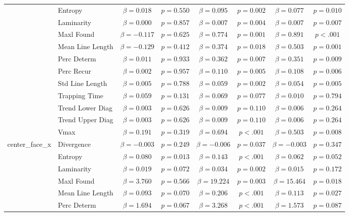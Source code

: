 \begin{tabular}{llcc|cc|cc}
 & Entropy & $\beta = 0.018$ & $p = 0.550$ & $\beta = 0.095$ & $p = 0.002$ & $\beta = 0.077$ & $p = 0.010$ \\
 & Laminarity & $\beta = 0.000$ & $p = 0.857$ & $\beta = 0.007$ & $p = 0.004$ & $\beta = 0.007$ & $p = 0.007$ \\
 & Maxl Found & $\beta = -0.117$ & $p = 0.625$ & $\beta = 0.774$ & $p = 0.001$ & $\beta = 0.891$ & $p < .001$ \\
 & Mean Line Length & $\beta = -0.129$ & $p = 0.412$ & $\beta = 0.374$ & $p = 0.018$ & $\beta = 0.503$ & $p = 0.001$ \\
 & Perc Determ & $\beta = 0.011$ & $p = 0.933$ & $\beta = 0.362$ & $p = 0.007$ & $\beta = 0.351$ & $p = 0.009$ \\
 & Perc Recur & $\beta = 0.002$ & $p = 0.957$ & $\beta = 0.110$ & $p = 0.005$ & $\beta = 0.108$ & $p = 0.006$ \\
 & Std Line Length & $\beta = 0.005$ & $p = 0.788$ & $\beta = 0.059$ & $p = 0.002$ & $\beta = 0.054$ & $p = 0.005$ \\
 & Trapping Time & $\beta = 0.059$ & $p = 0.131$ & $\beta = 0.069$ & $p = 0.077$ & $\beta = 0.010$ & $p = 0.794$ \\
 & Trend Lower Diag & $\beta = 0.003$ & $p = 0.626$ & $\beta = 0.009$ & $p = 0.110$ & $\beta = 0.006$ & $p = 0.264$ \\
 & Trend Upper Diag & $\beta = 0.003$ & $p = 0.626$ & $\beta = 0.009$ & $p = 0.110$ & $\beta = 0.006$ & $p = 0.264$ \\
 & Vmax & $\beta = 0.191$ & $p = 0.319$ & $\beta = 0.694$ & $p < .001$ & $\beta = 0.503$ & $p = 0.008$ \\
\midrule
\multirow{12}{*}{center_face_x} & Divergence & $\beta = -0.003$ & $p = 0.249$ & $\beta = -0.006$ & $p = 0.037$ & $\beta = -0.003$ & $p = 0.347$ \\
 & Entropy & $\beta = 0.080$ & $p = 0.013$ & $\beta = 0.143$ & $p < .001$ & $\beta = 0.062$ & $p = 0.052$ \\
 & Laminarity & $\beta = 0.019$ & $p = 0.072$ & $\beta = 0.034$ & $p = 0.002$ & $\beta = 0.015$ & $p = 0.172$ \\
 & Maxl Found & $\beta = 3.760$ & $p = 0.566$ & $\beta = 19.224$ & $p = 0.003$ & $\beta = 15.464$ & $p = 0.018$ \\
 & Mean Line Length & $\beta = 0.093$ & $p = 0.070$ & $\beta = 0.206$ & $p < .001$ & $\beta = 0.113$ & $p = 0.027$ \\
 & Perc Determ & $\beta = 1.694$ & $p = 0.067$ & $\beta = 3.268$ & $p < .001$ & $\beta = 1.573$ & $p = 0.087$ \\

\end{tabular}
